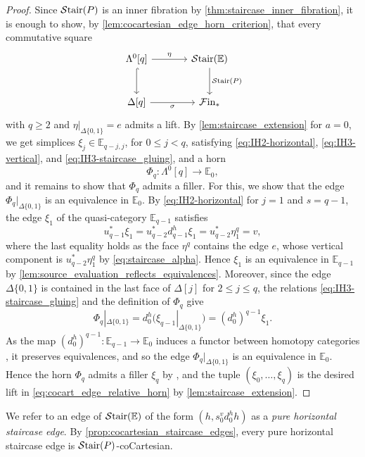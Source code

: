 \documentclass[10pt,reqno]{amsart}
\begin{document}
\begin{proof}
Since $\mathcal{S}\mathrm{tair}(P)$ is an inner fibration by
\cref{thm:staircase_inner_fibration}, it is enough to show, by
\cref{lem:cocartesian_edge_horn_criterion}, that every commutative
square
\begin{equation}
\label{eq:cocart_edge_relative_horn}
\begin{tikzcd}[sep=large]
 \Lambda^0[q]\ar[r,"\eta"]\ar[d,hook] &
 \Stair(\mathbb E)\ar[d,"\Stair(P)"]\\
 \Delta[q]\ar[r,"\sigma"'] & \simFin
\end{tikzcd}
\end{equation}
with $q\geq2$ and $\eta|_{\Delta\{0,1\}}=e$ admits a lift. By
\cref{lem:staircase_extension} for $a=0$, we get simplices
$\xi_j\in\mathbb E_{q-j,j}$, for $0\leq j<q$, satisfying
\eqref{eq:IH2-horizontal}, \eqref{eq:IH3-vertical}, and
\eqref{eq:IH3-staircase_gluing}, and a horn
\[
\Phi_q:\Lambda^0[q]\longrightarrow\mathbb E_0,
\]
and it remains to show that $\Phi_q$ admits a filler. For this, we
show that the edge $\Phi_q|_{\Delta\{0,1\}}$ is an equivalence in
$\mathbb E_0$. By \eqref{eq:IH2-horizontal} for $j=1$ and
$s=q-1$, the edge $\xi_1$ of the quasi-category
$\mathbb E_{q-1}$ satisfies
\[
 u_{q-1}^*\xi_1
 =u_{q-2}^*d_{q-1}^h\xi_1
 =u_{q-2}^*\eta^q_1
 =v,
\]
where the last equality holds as the face $\eta^q$ contains the edge
$e$, whose vertical component is $u_{q-2}^*\eta^q_1$ by
\eqref{eq:staircase_alpha}. Hence $\xi_1$ is an equivalence in
$\mathbb E_{q-1}$ by
\cref{lem:source_evaluation_reflects_equivalences}. Moreover, since
the edge $\Delta\{0,1\}$ is contained in the last face of
$\Delta[j]$ for $2\leq j\leq q$, the relations
\eqref{eq:IH3-staircase_gluing} and the definition of $\Phi_q$ give
\begin{equation}
\label{eq:cocart_edge_final_initial_edge}
 \Phi_q|_{\Delta\{0,1\}}
 =d_0^h\bigl(\xi_{q-1}|_{\Delta\{0,1\}}\bigr)
 =(d_0^h)^{q-1}\xi_1.
\end{equation}
As the map $(d_0^h)^{q-1}:\mathbb E_{q-1}\to\mathbb E_0$ induces a
functor between homotopy categories
\cite[\S1.2.3]{lurie2009higher}, it preserves equivalences, and so the
edge $\Phi_q|_{\Delta\{0,1\}}$ is an equivalence in $\mathbb E_0$.
Hence the horn $\Phi_q$ admits a filler $\xi_q$ by
\cite[Proposition~1.2.4.3]{lurie2009higher}, and the tuple
$(\xi_0,\ldots,\xi_q)$ is the desired lift in
\eqref{eq:cocart_edge_relative_horn} by
\cref{lem:staircase_extension}.
\end{proof}

We refer to an edge of $\mathcal{S}\mathrm{tair}(\mathbb E)$ of the form
$(h,s_0^v d_0^h h)$ as a \emph{pure horizontal staircase edge}. By
\cref{prop:cocartesian_staircase_edges}, every pure horizontal
staircase edge is $\mathcal{S}\mathrm{tair}(P)$-coCartesian.
\end{document}
